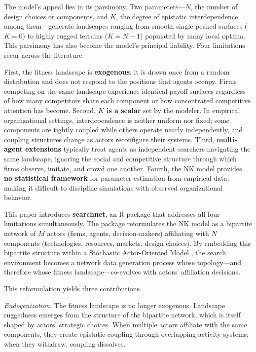 \documentclass[
]{article}
\begin{document}
The model's appeal lies in its parsimony. Two parameters---\(N\), the
number of design choices or components, and \(K\), the degree of
epistatic interdependence among them---generate landscapes ranging from
smooth single-peaked surfaces (\(K = 0\)) to highly rugged terrains
(\(K = N - 1\)) populated by many local optima. This parsimony has also
become the model's principal liability. Four limitations recur across
the literature.

First, the fitness landscape is \textbf{exogenous}: it is drawn once
from a random distribution and does not respond to the positions that
agents occupy. Firms competing on the same landscape experience
identical payoff surfaces regardless of how many competitors share each
component or how concentrated competitive attention has become. Second,
\textbf{\(K\) is a scalar} set by the modeler. In empirical
organizational settings, interdependence is neither uniform nor fixed;
some components are tightly coupled while others operate nearly
independently, and coupling structures change as actors reconfigure
their systems. Third, \textbf{multi-agent extensions} typically treat
agents as independent searchers navigating the same landscape, ignoring
the social and competitive structure through which firms observe,
imitate, and crowd one another. Fourth, the NK model provides \textbf{no
statistical framework} for parameter estimation from empirical data,
making it difficult to discipline simulations with observed
organizational behavior.

This paper introduces \textbf{searchnet}, an \textsf{R} package that
addresses all four limitations simultaneously. The package reformulates
the NK model as a bipartite network of \(M\) actors (firms, agents,
decision-makers) affiliating with \(N\) components (technologies,
resources, markets, design choices). By embedding this bipartite
structure within a Stochastic Actor-Oriented Model
\citep[SAOM;][]{Snijders1996, SnijdersVdBuntSteglich2010}, the search
environment becomes a network data generation process whose
topology---and therefore whose fitness landscape---co-evolves with
actors' affiliation decisions.

This reformulation yields three contributions.

\emph{Endogenization.} The fitness landscape is no longer exogenous.
Landscape ruggedness emerges from the structure of the bipartite
network, which is itself shaped by actors' strategic choices. When
multiple actors affiliate with the same components, they create
epistatic coupling through overlapping activity systems; when they
withdraw, coupling dissolves.
\end{document}
